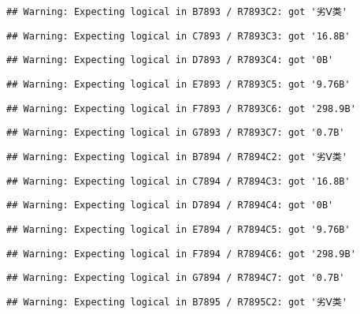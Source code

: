 \documentclass[
]{article}
\begin{document}
\begin{verbatim}
## Warning: Expecting logical in B7893 / R7893C2: got '劣Ⅴ类'
\end{verbatim}

\begin{verbatim}
## Warning: Expecting logical in C7893 / R7893C3: got '16.8B'
\end{verbatim}

\begin{verbatim}
## Warning: Expecting logical in D7893 / R7893C4: got '0B'
\end{verbatim}

\begin{verbatim}
## Warning: Expecting logical in E7893 / R7893C5: got '9.76B'
\end{verbatim}

\begin{verbatim}
## Warning: Expecting logical in F7893 / R7893C6: got '298.9B'
\end{verbatim}

\begin{verbatim}
## Warning: Expecting logical in G7893 / R7893C7: got '0.7B'
\end{verbatim}

\begin{verbatim}
## Warning: Expecting logical in B7894 / R7894C2: got '劣Ⅴ类'
\end{verbatim}

\begin{verbatim}
## Warning: Expecting logical in C7894 / R7894C3: got '16.8B'
\end{verbatim}

\begin{verbatim}
## Warning: Expecting logical in D7894 / R7894C4: got '0B'
\end{verbatim}

\begin{verbatim}
## Warning: Expecting logical in E7894 / R7894C5: got '9.76B'
\end{verbatim}

\begin{verbatim}
## Warning: Expecting logical in F7894 / R7894C6: got '298.9B'
\end{verbatim}

\begin{verbatim}
## Warning: Expecting logical in G7894 / R7894C7: got '0.7B'
\end{verbatim}

\begin{verbatim}
## Warning: Expecting logical in B7895 / R7895C2: got '劣Ⅴ类'
\end{verbatim}
\end{document}

